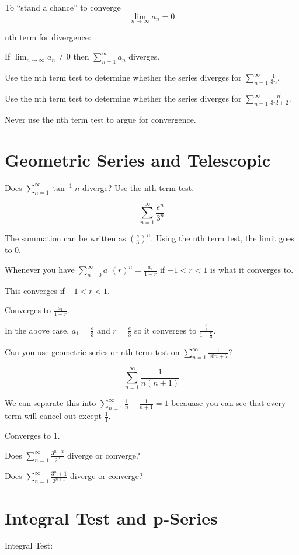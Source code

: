 \documentclass[../bccalc.tex]{subfiles}
\begin{document}
To ``stand a chance'' to converge 
\[ \lim_{n\to\infty}a_n=0\]

nth term for divergence:

If $\lim_{n\to\infty}a_n\neq 0$ then $\sum_{n=1}^{\infty}a_n$ diverges.

\ex Use the nth term test to determine whether the series diverges for $\sum_{n=1}^{\infty}\frac{1}{3n}$.

\ex Use the nth term test to determine whether the series diverges for $\sum_{n=1}^{\infty}\frac{n!}{3n!+2}$.

Never use the nth term test to argue for convergence.
\section{Geometric Series and Telescopic}
\ex Does $\sum_{n=1}^{\infty}\tan^{-1}n$ diverge? Use the nth term test.

\begin{example}
    \[ \sum_{n=1}^{\infty}\frac{e^n}{3^n}\]

    The summation can be written as $\left(\frac{e}{3}\right)^n$. Using the nth term test, the limit goes to 0.

    Whenever you have $\sum_{n=0}^{\infty}a_1(r)^n = \frac{a_1}{1-r}$ if $-1<r<1$ is what it converges to.
    
    This converges if $-1<r<1$.

    Converges to $\frac{a_1}{1-r}$.

    In the above case, $a_1=\frac{e}{3}$ and $r=\frac{e}{3}$ so it converges to $\frac{\frac{e}{3}}{1-\frac{e}{3}}$.
\end{example}

\ex Can you use geometric series or nth term test on $\sum_{n=1}^{\infty}\frac{1}{10n+7}$?

\begin{example}
    \[ \sum_{n=1}^{\infty}\frac{1}{n(n+1)} \]

    We can separate this into $\sum_{n=1}^{\infty}\frac{1}{n}-\frac{1}{n+1}=1$ becauase you can see that every term will cancel out except $\frac{1}{1}$.

    Converges to 1.
\end{example}

\ex Does $\sum_{n=1}^{\infty} \frac{3^{n-2}}{2^n}$ diverge or converge?

\ex Does $\sum_{n=1}^{\infty}\frac{3^n+1}{3^{n+1}}$ diverge or converge?

\section{Integral Test and p-Series}
Integral Test:
\end{document}
